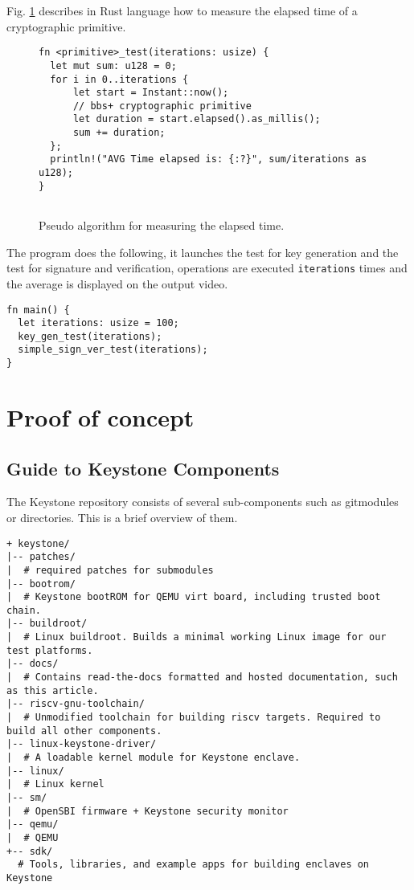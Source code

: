 Fig. \ref{bbs-pseudo-algo} describes in Rust language how to measure the elapsed time of a cryptographic primitive. \\
\begin{figure}[H]
\begin{lstlisting}[frame=single]
fn <primitive>_test(iterations: usize) {
  let mut sum: u128 = 0;
  for i in 0..iterations {
      let start = Instant::now();
      // bbs+ cryptographic primitive
      let duration = start.elapsed().as_millis();
      sum += duration;
  };
  println!("AVG Time elapsed is: {:?}", sum/iterations as u128);
}
    
\end{lstlisting}
\caption{Pseudo algorithm for measuring the elapsed time.}
\label{bbs-pseudo-algo}
\end{figure}
The program does the following, it launches the test for key generation and the test for signature and verification, operations are executed \texttt{iterations} times and the average is displayed on the output video.  \\
\begin{lstlisting}[frame=single]
fn main() {
  let iterations: usize = 100;
  key_gen_test(iterations);
  simple_sign_ver_test(iterations);
}
\end{lstlisting}


\newpage
\section{Proof of concept}
\subsection{Guide to Keystone Components}
The Keystone repository consists of several sub-components such as gitmodules or directories. This is a brief overview of them. \\
\begin{lstlisting}[frame=single]
+ keystone/
|-- patches/
|  # required patches for submodules
|-- bootrom/
|  # Keystone bootROM for QEMU virt board, including trusted boot chain.
|-- buildroot/
|  # Linux buildroot. Builds a minimal working Linux image for our test platforms.
|-- docs/
|  # Contains read-the-docs formatted and hosted documentation, such as this article.
|-- riscv-gnu-toolchain/
|  # Unmodified toolchain for building riscv targets. Required to build all other components.
|-- linux-keystone-driver/
|  # A loadable kernel module for Keystone enclave.
|-- linux/
|  # Linux kernel
|-- sm/
|  # OpenSBI firmware + Keystone security monitor
|-- qemu/
|  # QEMU
+-- sdk/
  # Tools, libraries, and example apps for building enclaves on Keystone        
\end{lstlisting}
\newpage
